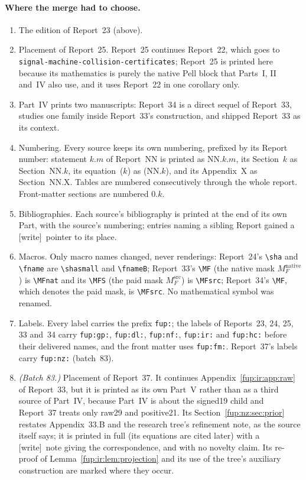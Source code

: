 \documentclass[11pt,letterpaper]{article}
\theoremstyle{definition}\newtheorem{definition}[theorem]{Definition}
\theoremstyle{remark}\newtheorem{remark}[theorem]{Remark}
\newcommand{\sha}[1]{\texttt{\small\seqsplit{#1}}}
\newcommand{\fname}[1]{\texttt{\small\detokenize{#1}}}
\newcommand{\fnameB}[1]{{\small\nolinkurl{#1}}}
\newcommand{\shasmall}[1]{\texttt{\scriptsize\seqsplit{#1}}}
\newcommand{\MFnat}{M_{F}^{\mathrm{native}}}
\newcommand{\MFsrc}{M_F^{\mathrm{src}}}
\newcommand{\wtag}{\textup{[write]}}
\newcommand{\rw}[1]{\nolinkurl{#1}}%
\begin{document}
\paragraph{Where the merge had to choose.}
\begin{enumerate}
\item The edition of Report~23 (above).
\item Placement of Report~25. Report~25 continues Report~22, which goes to \rw{signal-machine-collision-certificates}; Report~25 is printed here because its mathematics is purely the native Pell block that Parts~I, II and~IV also use, and it uses Report~22 in one corollary only.
\item Part~IV prints two manuscripts: Report~34 is a direct sequel of Report~33, studies one family inside Report~33's construction, and shipped Report~33 as its context.
\item Numbering. Every source keeps its own numbering, prefixed by its Report number: statement $k.m$ of Report~NN is printed as NN.$k.m$, its Section~$k$ as Section~NN.$k$, its equation~($k$) as (NN.$k$), and its Appendix~X as Section~NN.X. Tables are numbered consecutively through the whole report. Front-matter sections are numbered 0.$k$.
\item Bibliographies. Each source's bibliography is printed at the end of its own Part, with the source's numbering; entries naming a sibling Report gained a \wtag\ pointer to its place.
\item Macros. Only macro names changed, never renderings: Report~24's \verb|\sha| and \verb|\fname| are \verb|\shasmall| and \verb|\fnameB|; Report~33's \verb|\MF| (the native mask $\MFnat$) is \verb|\MFnat| and its \verb|\MFS| (the paid mask $\MFsrc$) is \verb|\MFsrc|; Report~34's \verb|\MF|, which denotes the paid mask, is \verb|\MFsrc|. No mathematical symbol was renamed.
\item Labels. Every label carries the prefix \texttt{fup:}; the labels of Reports~23, 24, 25, 33 and~34 carry \texttt{fup:gp:}, \texttt{fup:dl:}, \texttt{fup:nf:}, \texttt{fup:ir:} and \texttt{fup:hc:} before their delivered names, and the front matter uses \texttt{fup:fm:}. Report~37's labels carry \texttt{fup:nz:} (batch~83).
\item \emph{(Batch 83.)} Placement of Report~37. It continues Appendix~\ref{fup:ir:app:raw} of Report~33, but it is printed as its own Part~V rather than as a third source of Part~IV, because Part~IV is about the signed19 child and Report~37 treats only raw29 and positive21. Its Section~\ref{fup:nz:sec:prior} restates Appendix~33.B and the research tree's refinement note, as the source itself says; it is printed in full (its equations are cited later) with a \wtag\ note giving the correspondence, and with no novelty claim. Its re-proof of Lemma~\ref{fup:ir:lem:projection} and its use of the tree's auxiliary construction are marked where they occur.

\end{enumerate}
\end{document}
